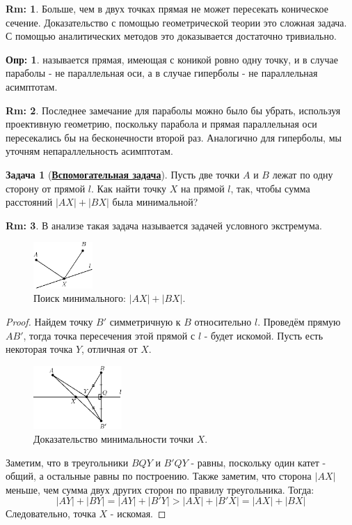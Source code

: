 \documentclass[12pt]{article}
\theoremstyle{definition}
\newtheorem{defn}{Опр:}
\newtheorem{rem}{Rm:}
\newtheorem{problem}{Задача}
\begin{document}
\begin{rem}
	Больше, чем в двух точках прямая не может пересекать коническое сечение. Доказательство с помощью геометрической теории это сложная задача. С помощью аналитических методов это доказывается достаточно тривиально.
\end{rem}

\begin{defn}
	 называется прямая, имеющая с коникой ровно одну точку, и в случае параболы - не параллельная  оси, а в случае гиперболы - не параллельная асимптотам.
\end{defn}
\begin{rem}
	Последнее замечание для параболы можно было бы убрать, используя проективную геометрию, поскольку парабола и прямая параллельная оси пересекались бы на бесконечности второй раз. Аналогично для гиперболы, мы уточням непараллельность асимптотам.
\end{rem}

\newpage
\begin{problem}[\textbf{\uline{Вспомогательная задача}}]
	Пусть две точки $A$ и $B$ лежат по одну сторону от прямой $l$. Как найти точку $X$ на прямой $l$, так, чтобы сумма расстояний $|AX| + |BX|$ была минимальной?
\end{problem}

\begin{rem}
	В анализе такая задача называется задачей условного экстремума.
\end{rem}
\begin{figure}[H]
	\centering
	\includegraphics[width=0.2\textwidth]{ANGL2_5.eps}
	\caption{Поиск минимального: $|AX| + |BX|$.}
	\label{2_5}
\end{figure}
\begin{proof}
	Найдем точку $B'$ симметричную к $B$ относительно $l$. Проведём прямую $AB'$, тогда точка пересечения этой прямой с $l$ - будет искомой. Пусть есть некоторая точка $Y$, отличная от $X$.
	\begin{figure}[H]
		\centering
		\includegraphics[width=0.3\textwidth]{ANGL2_6.eps}
		\caption{Доказательство минимальности точки $X$.}
		\label{2_6}
	\end{figure}
	Заметим, что в треугольники $BQY$ и $B'QY$ - равны, поскольку один катет - общий, а остальные равны по построению. Также заметим, что сторона $|AX|$ меньше, чем сумма двух других сторон по правилу треугольника. Тогда:
	$$
		|AY| + |BY| = |AY| + |B'Y| > |AX| + |B'X| = |AX| + |BX|
	$$
	Следовательно, точка $X$ - искомая.
\end{proof}
\end{document}
